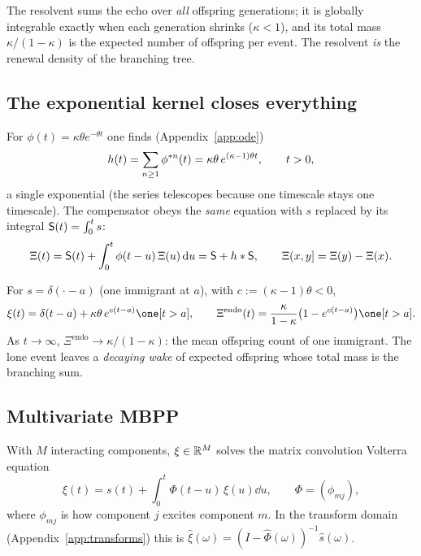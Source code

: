 \begin{intuition}
The resolvent sums the echo over \emph{all} offspring generations; it is globally
integrable exactly when each generation shrinks ($\kappa<1$), and its total mass
$\kappa/(1-\kappa)$ is the expected number of offspring per event. The resolvent
\emph{is} the renewal density of the branching tree.
\end{intuition}

\subsection{The exponential kernel closes everything}

For $\phi(t)=\kappa\theta e^{-\theta t}$ one finds (Appendix~\ref{app:ode})
\begin{equation}
h(t)=\sum_{n\ge1}\phi^{\ast n}(t)=\kappa\theta\,e^{(\kappa-1)\theta t},\qquad t>0,
\label{eq:h-exp}
\end{equation}
a single exponential (the series telescopes because one timescale stays one
timescale). The compensator obeys the \emph{same} equation with $s$ replaced by its
integral $\mathsf{S}(t)=\int_0^t s$:
\begin{equation}
\Xi(t)=\mathsf{S}(t)+\int_0^t\phi(t-u)\,\Xi(u)\,\mathrm{d} u=\mathsf{S}+h\ast\mathsf{S},
\qquad \Xi(x,y]=\Xi(y)-\Xi(x).
\end{equation}

\begin{example}
For $s=\delta(\cdot-a)$ (one immigrant at $a$), with $c:=(\kappa-1)\theta<0$,
\begin{equation*}
\xi(t)=\delta(t-a)+\kappa\theta\,e^{c(t-a)}\one[t>a],\qquad
\Xi^{\mathrm{endo}}(t)=\frac{\kappa}{1-\kappa}\bigl(1-e^{c(t-a)}\bigr)\one[t>a].
\end{equation*}
As $t\to\infty$, $\Xi^{\mathrm{endo}}\to\kappa/(1-\kappa)$: the mean offspring count
of one immigrant. The lone event leaves a \emph{decaying wake} of expected
offspring whose total mass is the branching sum.
\end{example}

\subsection{Multivariate MBPP}

With $M$ interacting components, $\xi\in\mathbb{R}^M$ solves the matrix convolution Volterra
equation
\begin{equation}
\xi(t)=s(t)+\int_0^t\Phi(t-u)\,\xi(u)\dd u,\qquad \Phi=(\phi_{mj}),
\label{eq:mbpp-mv}
\end{equation}
where $\phi_{mj}$ is how component $j$ excites component $m$. In the
transform domain (Appendix~\ref{app:transforms}) this is
$\hat\xi(\omega)=(I-\hat\Phi(\omega))^{-1}\hat s(\omega)$.

